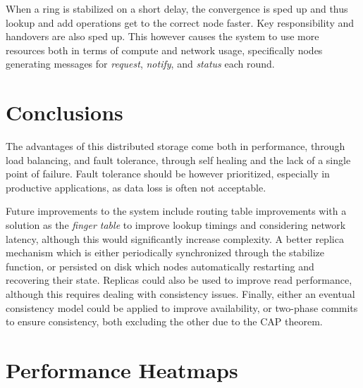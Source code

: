 \documentclass[a4paper, 11pt]{article}
\begin{document}
When a ring is stabilized on a short delay, the convergence is sped up and thus lookup and add operations get to the correct node faster. Key responsibility and handovers are also sped up.
This however causes the system to use more resources both in terms of compute and network usage, specifically nodes generating messages for \textit{request}, \textit{notify}, and \textit{status} each round.

\section{Conclusions}

The advantages of this distributed storage come both in performance, through load balancing, and fault tolerance, through self healing and the lack of a single point of failure.
Fault tolerance should be however prioritized, especially in productive applications, as data loss is often not acceptable.

Future improvements to the system include routing table improvements with a solution as the \textit{finger table} to improve lookup timings and considering network latency, although this would significantly increase complexity.
A better replica mechanism which is either periodically synchronized through the stabilize function, or persisted on disk which nodes automatically restarting and recovering their state. Replicas could also be used to improve read performance, although this requires dealing with consistency issues.
Finally, either an eventual consistency model could be applied to improve availability, or two-phase commits to ensure consistency, both excluding the other due to the CAP theorem.

\newpage

\appendix

\section{Performance Heatmaps}
\end{document}
